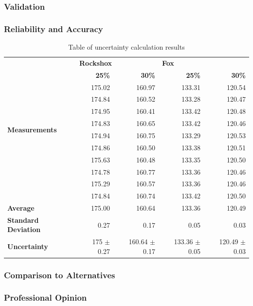 	\subsubsection{Validation}
	\subsubsection{Reliability and Accuracy}
		\begin{table}[h!]
			\centering
			\caption{Table of uncertainty calculation results}
			\label{tab:uncertainty}
		\begin{tabular}{|l|r|r|r|r|}
			\hline
			\multirow{12}{7em}{\bfseries Measurements}&\multicolumn{2}{|l|}{\bfseries Rockshox}&\multicolumn{2}{|l|}{\bfseries Fox}\\
			\cline{2-5}
			&\bfseries 25\%&\bfseries 30\%&\bfseries 25\%&\bfseries 30\%\\
			\hline
			&175.02&160.97&133.31&120.54\\
			&174.84&160.52&133.28&120.47\\
			&174.95&160.41&133.42&120.48\\
			&174.83&160.65&133.42&120.46\\
			&174.94&160.75&133.29&120.53\\
			&174.86&160.50&133.38&120.51\\
			&175.63&160.48&133.35&120.50\\
			&174.78&160.77&133.36&120.46\\
			&175.29&160.57&133.36&120.46\\
			&174.84&160.74&133.42&120.50\\
			\hline
			\bfseries Average&175.00&160.64&133.36&120.49\\
			\bfseries Standard Deviation&0.27&0.17&0.05&0.03\\
			\bfseries Uncertainty&175 $\pm$ 0.27&160.64 $\pm$ 0.17&133.36 $\pm$ 0.05&120.49 $\pm$ 0.03\\
			\hline
		\end{tabular}
		\end{table}
	\subsubsection{Comparison to Alternatives}
	\subsubsection{Professional Opinion}